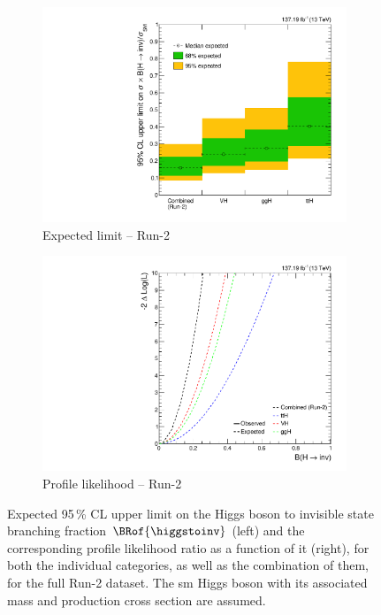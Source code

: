 \begin{figure}[htbp]
    \centering
    \begin{subfigure}[b]{0.45\textwidth}  %
        \includegraphics[width=\textwidth]{figures/limits/full_Run2/limit_Run2_comb_per_cat_Scenario5.pdf}
        \caption{Expected limit -- Run-2}
    \end{subfigure}
    \hspace{0.05\textwidth}
    \begin{subfigure}[b]{0.45\textwidth}
        \includegraphics[width=\textwidth]{figures/likelihood_scan/profile_likelihood_scan_Run2_per_cat_Scenario5.pdf}
        \caption{Profile likelihood -- Run-2}
    \end{subfigure}
    \caption[Expected 95\,\% CL upper limit on the Higgs boson to invisible state branching fraction $\BRof{\higgstoinv}$ and the corresponding profile likelihood ratio as a function of it, for both the individual categories, as well as the combination of them, for the full Run-2 dataset]{Expected 95\,\% CL upper limit on the Higgs boson to invisible state branching fraction $\BRof{\higgstoinv}$ (left) and the corresponding profile likelihood ratio as a function of it (right), for both the individual categories, as well as the combination of them, for the full Run-2 dataset. The \acrlong{sm} Higgs boson with its associated mass and production cross section are assumed.}
    \label{fig:htoinv_limit_likelihood_Run2_per_cat}
\end{figure}

